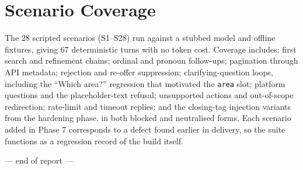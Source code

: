 \documentclass[11pt,a4paper]{article}
\newcommand{\fn}[1]{\texttt{\small #1}}
\begin{document}
\section{Scenario Coverage}

The 28 scripted scenarios (S1--S28) run against a stubbed model and offline fixtures, giving
67 deterministic turns with no token cost. Coverage includes: first search and refinement
chains; ordinal and pronoun follow-ups; pagination through API metadata; rejection and
re-offer suppression; clarifying-question loops, including the ``Which area?'' regression that
motivated the \fn{area} slot; platform questions and the placeholder-text refusal; unsupported
actions and out-of-scope redirection; rate-limit and timeout replies; and the closing-tag
injection variants from the hardening phase, in both blocked and neutralised forms. Each
scenario added in Phase 7 corresponds to a defect found earlier in delivery, so the suite
functions as a regression record of the build itself.

\vfill
\begin{center}
\small\color{black!55}
--- end of report ---
\end{center}
\end{document}

